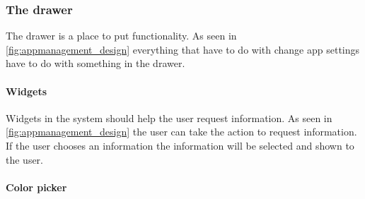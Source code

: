 \subsubsection{The drawer}
\label{sec:drawer}
The drawer is a place to put functionality. As seen in \autoref{fig:appmanagement_design} everything that have to do with change app settings have to do with something in the drawer.
\paragraph{Widgets}
\label{par:widgets}
Widgets in the \giraf[] system should help the user request information. As seen in \autoref{fig:appmanagement_design} the user can take the action to request information. If the user chooses an information the information will be selected and shown to the user.

\paragraph{Color picker}
\label{par:colorpicker}
